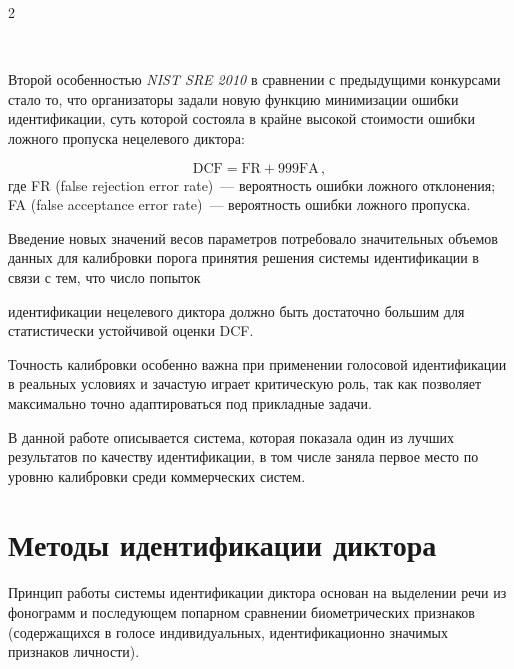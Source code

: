 \begin{multicols}{2}
  \begin{figure} %
   \vspace*{1pt}
 \begin{center}
 \mbox{%
 \epsfxsize=150.382mm
 }
 \end{center}
 \vspace*{-9pt}
  \end{figure}

  Второй особенностью \textit{NIST SRE 2010} в сравнении с предыдущими 
конкурсами стало то, что организаторы задали новую функцию минимизации 
ошибки идентификации, суть которой состояла в крайне высокой стоимости 
ошибки ложного пропуска нецелевого диктора:

\noindent
  $$
\mathrm{DCF = FR + 999 FA}\,,
$$
где FR (false rejection error rate)~--- вероятность \mbox{ошибки} ложного отклонения;
FA (false acceptance error rate)~--- вероятность ошибки ложного про\-пуска.

  Введение новых значений весов параметров потребовало значительных 
объемов данных для калиб\-ров\-ки порога принятия решения системы 
идентификации в связи с тем, что число попыток\linebreak\vspace*{-12pt}
\pagebreak

\noindent идентификации нецелевого 
диктора должно быть достаточно большим для статистически устойчивой оценки 
DCF. 
  
  Точность калибровки особенно важна при применении голосовой 
идентификации в реальных условиях и зачастую играет критическую роль, так как 
позволяет максимально точно адаптироваться под прикладные задачи.
  
  В данной работе описывается система, которая показала один из лучших 
результатов по качеству идентификации, в том числе заняла первое место по 
уровню калибровки среди коммерческих систем.
  
\section{Методы идентификации диктора}

  Принцип работы системы идентификации диктора основан на выделении речи 
из фонограмм и последующем попарном сравнении биометрических признаков 
(содержащихся в голосе индивидуальных, идентификационно значимых 
признаков личности). 
  

\end{multicols}
